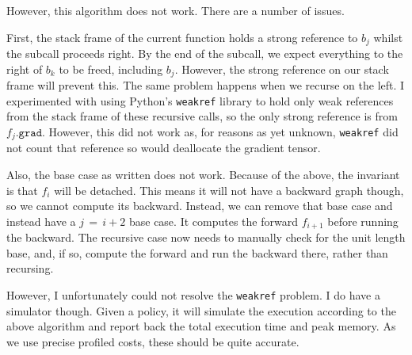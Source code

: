 However, this algorithm does not work.
There are a number of issues.

First, the stack frame of the current function holds a strong reference to \(b_j\) whilst the subcall proceeds right.
By the end of the subcall, we expect everything to the right of \(b_k\) to be freed, including \(b_j\).
However, the strong reference on our stack frame will prevent this.
The same problem happens when we recurse on the left.
I experimented with using Python's \texttt{weakref} library to hold only weak references from the stack frame of these recursive calls, so the only strong reference is from \(f_j\texttt{.grad}\).
However, this did not work as, for reasons as yet unknown, \texttt{weakref} did not count that reference so would deallocate the gradient tensor.

Also, the base case as written does not work.
Because of the above, the invariant is that \(f_i\) will be detached.
This means it will not have a backward graph though, so we cannot compute its backward.
Instead, we can remove that base case and instead have a \(j\,=\,i+2\) base case.
It computes the forward \(f_{i+1}\) before running the backward.
The recursive case now needs to manually check for the unit length base, and, if so, compute the forward and run the backward there, rather than recursing.

However, I unfortunately could not resolve the \texttt{weakref} problem.
I do have a simulator though.
Given a policy, it will simulate the execution according to the above algorithm and report back the total execution time and peak memory.
As we use precise profiled costs, these should be quite accurate.
 